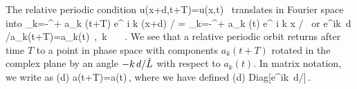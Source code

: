 The relative periodic condition
\beq
	u(x+d,t+T)=u(x,t) \,
\eeq
translates in Fourier space into
\beq	
	\sum_{k=-\infty}^{+\infty} a_k (t+T) e^{ i k (x+d) / \tildeL} 
		= \sum_{k=-\infty}^{+\infty} a_k (t) e^{ i k x / \tildeL} \,
\eeq
or
\beq
	e^{ik\, d /\tildeL}a_k(t+T)=a_k(t) \,,\ \forall k \in {}\ \ \ .
	\label{eq:RPOcondition}
\eeq
We see that a relative periodic orbit returns after time $T$ to a point in 
phase space with components $a_k(t+T)$ rotated in the complex plane by an 
angle $-k\, d /\tilde{L}$ with respect to $a_k(t)$. In matrix notation, we write  as
\beq
	(d)  a(t+T)=a(t)\,,
	\label{eq:RPO}
\eeq
where we have defined
\beq
	(d) \equiv Diag[e^{ik\, d/\tildeL}]\,.
\eeq


